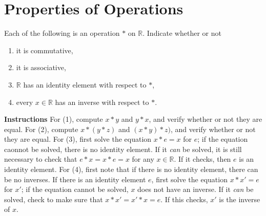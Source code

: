 \documentclass[draft,twoside]{amsart}
\newcommand{\Reals}{\mathbb{R}{}}
\begin{document}
\section{Properties of Operations}

Each of the following is an operation $*$ on $\Reals$. Indicate whether or
not
\begin{enumerate}
   \item it is commutative,
   \item it is associative,
   \item $\Reals$ has an identity element with respect to $*$,
   \item every $x \in \Reals$ has an inverse with respect to $*$.
\end{enumerate}

\textbf{Instructions} For (1), compute $x * y$ and $y * x$, and verify whether
or not they are equal. For (2), compute $x * (y * z)$ and $(x * y) * z)$, and
verify whether or not they are equal. For (3), first solve the equation
$x * e = x$ for $e$; if the equation caonnot be solved, there is no identity
element. If it \emph{can} be solved, it is still necessary to check that
$e*x=x*e=x$ for any $x\in \Reals$. If it checks, then $e$ is an identity
element. For (4), first note that if there is no identity element, there can
be no inverses. If there is an identity element $e$, first solve the
equation $x*x'=e$ for $x'$; if the equation cannot be solved, $x$ does 
not have an inverse. If it \emph{can} be solved, check to make sure that
$x*x'=x'*x=e$. If this checks, $x'$ is the inverse of $x$.
\end{document}
